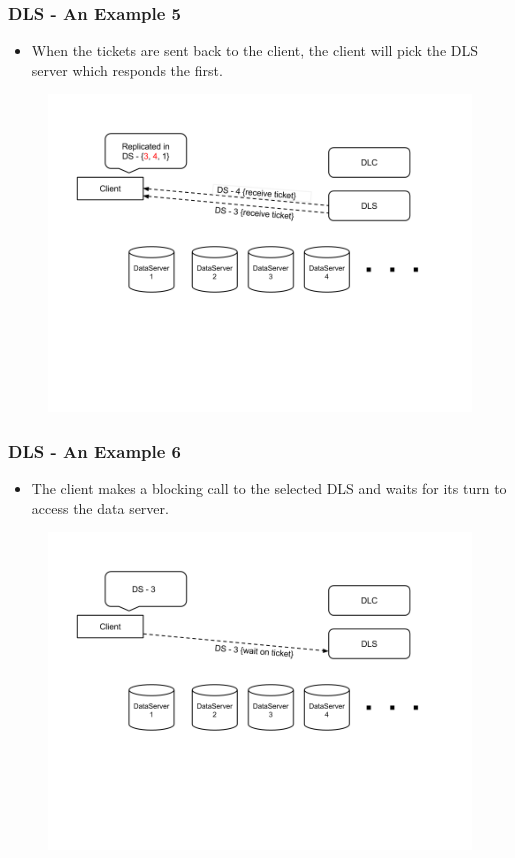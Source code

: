 \documentclass{beamer}
\begin{document}
\begin{frame}
  \frametitle{DLS - An Example 5}
  \begin{itemize}
  \item When the tickets are sent back to the client, the client will pick
    the DLS server which responds the first.
  \end{itemize}
  \begin{figure}
    \begin{center}
      \centerline{\includegraphics[scale=0.40]{img/DLS_Example6.png}}
    \end{center}
  \end{figure}
\end{frame}

\begin{frame}
  \frametitle{DLS - An Example 6}
  \begin{itemize}
  \item The client makes a blocking call to the selected DLS and waits for
    its turn to access the data server.
  \end{itemize}
  \begin{figure}
    \begin{center}
      \centerline{\includegraphics[scale=0.40]{img/DLS_Example7.png}}
    \end{center}
  \end{figure}
\end{frame}
\end{document}
